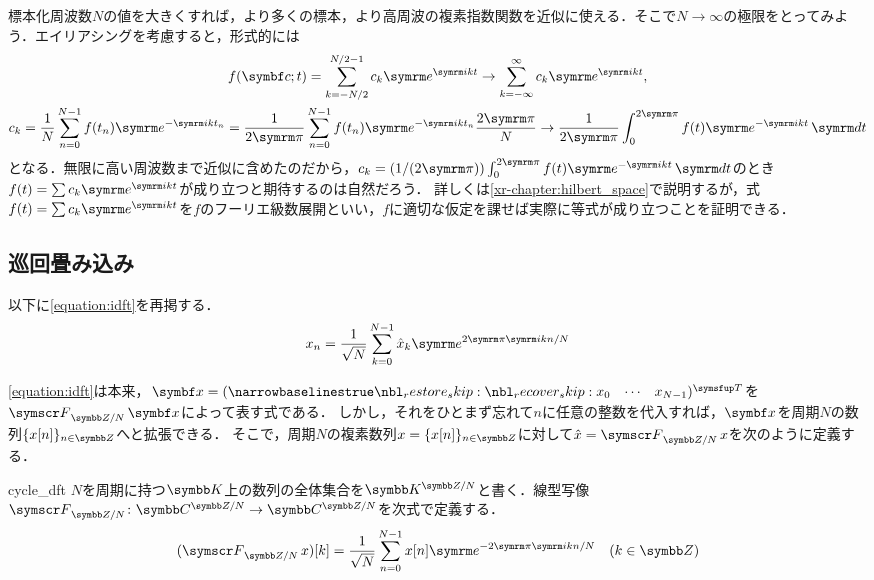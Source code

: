 \documentclass[../../main]{subfiles}
\begin{document}
\begin{note}
  標本化周波数\(N\)の値を大きくすれば，より多くの標本，より高周波の複素指数関数を近似に使える．そこで\(N\to\infty\)の極限をとってみよう．エイリアシングを考慮すると，形式的には
  \begin{gather*}
    f(\vect{c};t) = \sum_{k=-N/2}^{N/2-1}c_k\napr^{\iuni kt}
    \to \sum_{k=-\infty}^\infty c_k\napr^{\iuni kt}, \\
    c_k = \frac{1}{N}\sum_{n=0}^{N-1}f(t_n)\napr^{-\iuni kt_n}
    = \frac{1}{2\krez}\sum_{n=0}^{N-1}f(t_n)\napr^{-\iuni kt_n}\frac{2\krez}{N}
    \to \frac{1}{2\krez}\int_0^{2\krez}f(t)\napr^{-\iuni kt}\intd{t}
  \end{gather*}
  となる．無限に高い周波数まで近似に含めたのだから，\(c_k=(1/(2\krez))\int_0^{2\krez}f(t)\napr^{-\iuni kt}\intd{t}\)のとき\(f(t)=\sum c_k\napr^{\iuni kt}\)が成り立つと期待するのは自然だろう．
  詳しくは\cref{xr-chapter:hilbert_space}で説明するが，式\(f(t)=\sum c_k\napr^{\iuni kt}\)を\(f\)のフーリエ級数展開といい，\(f\)に適切な仮定を課せば実際に等式が成り立つことを証明できる．
\end{note}

\subsection{巡回畳み込み}

以下に\cref{equation:idft}を再掲する．
\[
  x_n = \frac{1}{\sqrt{N}}\sum_{k=0}^{N-1}\hat{x}_k\napr^{2\krez\iuni kn/N}
\]

\cref{equation:idft}は本来，\(\vect{x}=\trps{\rowvect{x_0 & \cdots & x_{N-1}}}\)を\(\dft{N}\vect{x}\)によって表す式である．
しかし，それをひとまず忘れて\(n\)に任意の整数を代入すれば，\(\vect{x}\)を周期\(N\)の数列\(\seq{x[n]}_{n\in\numset{Z}}\)へと拡張できる．
そこで，周期\(N\)の複素数列\(x=\seq{x[n]}_{n\in\numset{Z}}\)に対して\(\hat{x}=\dft{N}x\)を次のように定義する．

\begin{definition}{}{cycle_dft}
  \(N\)を周期に持つ\(\numset{K}\)上の数列の全体集合を\(\cycles{\numset{K}}{N}\)と書く．線型写像\(\dft{N}\colon\cycles{\numset{C}}{N}\to\cycles{\numset{C}}{N}\)を次式で定義する．
  \[
    (\dft{N}x)[k] = \frac{1}{\sqrt{N}}\sum_{n=0}^{N-1}x[n]\napr^{-2\krez\iuni kn/N}\quad(k\in\numset{Z})
  \]
\end{definition}
\end{document}
